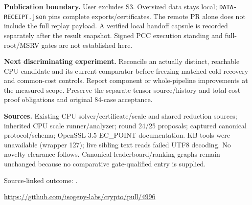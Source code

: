 \documentclass[10pt]{article}
\begin{document}
\textbf{Publication boundary.} User excludes S3. Oversized data stays local;
\texttt{DATA-RECEIPT.json} pins complete exports/certificates. The remote PR alone
does not include the full replay payload. A verified local handoff capsule is
recorded separately after the result snapshot. Signed PCC execution standing
and full-root/MSRV gates are not established here.

\textbf{Next discriminating experiment.} Reconcile an actually distinct,
reachable CPU candidate and its current comparator before freezing matched
cold-recovery and common-cost controls. Report component or whole-pipeline
improvements at the measured scope. Preserve the separate tensor source/history
and total-cost proof obligations and original 84-case acceptance.

\textbf{Sources.} Existing CPU solver/certificate/scale and shared reduction
sources; inherited CPU scale runner/analyzer; round 24/25 proposals; captured
canonical protocol/schema; OpenSSL 3.5 EC\_POINT documentation. KB tools were
unavailable (wrapper 127); live sibling text reads failed UTF8 decoding.
No novelty clearance follows. Canonical leaderboard/ranking graphs remain
unchanged because no comparative gate-qualified entry is supplied.

\small Source-linked outcome: .\par
\url{https://github.com/isogeny-labs/crypto/pull/4996}
\end{document}
